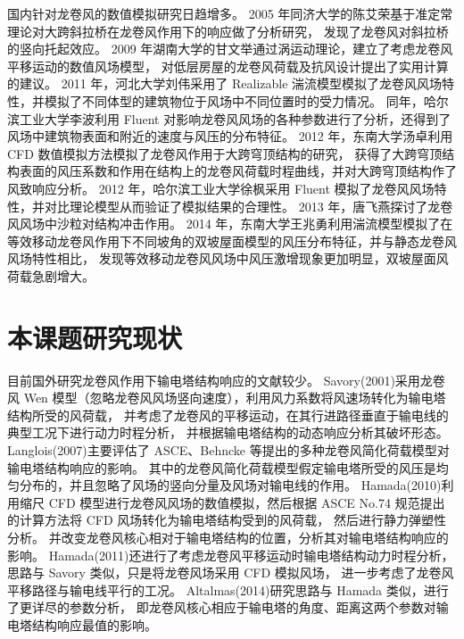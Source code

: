 国内针对龙卷风的数值模拟研究日趋增多。
2005 年同济大学的陈艾荣\cite{chen2004large}基于准定常理论对大跨斜拉桥在龙卷风作用下的响应做了分析研究，
发现了龙卷风对斜拉桥的竖向托起效应。
2009 年湖南大学的甘文举\cite{gan2009low}通过涡运动理论，建立了考虑龙卷风平移运动的数值风场模型，
对低层房屋的龙卷风荷载及抗风设计提出了实用计算的建议。
2011 年，河北大学刘伟\cite{liu2011lou}采用了 Realizable 湍流模型模拟了龙卷风风场特性，并模拟了不同体型的建筑物位于风场中不同位置时的受力情况。
同年，哈尔滨工业大学李波利用 Fluent 对影响龙卷风风场的各种参数进行了分析，还得到了风场中建筑物表面和附近的速度与风压的分布特征。
2012 年，东南大学汤卓\cite{tang2012tornado}利用 CFD 数值模拟方法模拟了龙卷风作用于大跨穹顶结构的研究，
获得了大跨穹顶结构表面的风压系数和作用在结构上的龙卷风荷载时程曲线，并对大跨穹顶结构作了风致响应分析。
2012 年，哈尔滨工业大学徐枫\cite{xu2013tornado}采用 Fluent 模拟了龙卷风风场特性，并对比理论模型从而验证了模拟结果的合理性。
2013 年，唐飞燕\cite{tang2013tornado}探讨了龙卷风风场中沙粒对结构冲击作用。
2014 年，东南大学王兆勇\cite{wang2015different}利用湍流模型模拟了在等效移动龙卷风作用下不同坡角的双坡屋面模型的风压分布特征，并与静态龙卷风风场特性相比，
发现等效移动龙卷风风场中风压激增现象更加明显，双坡屋面风荷载急剧增大。

\section{本课题研究现状}

目前国外研究龙卷风作用下输电塔结构响应的文献较少。
Savory(2001)\cite{savory2001modelling}采用龙卷风 Wen 模型（忽略龙卷风风场竖向速度），利用风力系数将风速场转化为输电塔结构所受的风荷载，
并考虑了龙卷风的平移运动，在其行进路径垂直于输电线的典型工况下进行动力时程分析，
并根据输电塔结构的动态响应分析其破坏形态。
Langlois(2007)\cite{langlois2007design}主要评估了 ASCE、Behncke 等提出的多种龙卷风简化荷载模型对输电塔结构响应的影响。
其中的龙卷风简化荷载模型假定输电塔所受的风压是均匀分布的，并且忽略了风场的竖向分量及风场对输电线的作用。
Hamada(2010)\cite{hamada2010finite}利用缩尺 CFD 模型进行龙卷风风场的数值模拟，然后根据 ASCE No.74 规范提出的计算方法将 CFD 风场转化为输电塔结构受到的风荷载，
然后进行静力弹塑性分析。
并改变龙卷风核心相对于输电塔结构的位置，分析其对输电塔结构响应的影响。
Hamada(2011)还进行了考虑龙卷风平移运动时输电塔结构动力时程分析，思路与 Savory 类似，只是将龙卷风场采用 CFD 模拟风场，
进一步考虑了龙卷风平移路径与输电线平行的工况。
Altalmas(2014)\cite{altalmas2014finite}研究思路与 Hamada 类似，进行了更详尽的参数分析，
即龙卷风核心相应于输电塔的角度、距离这两个参数对输电塔结构响应最值的影响。

